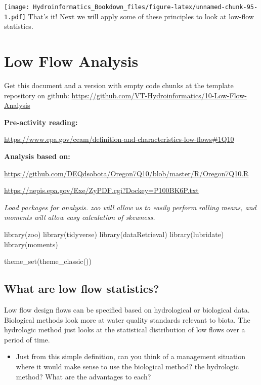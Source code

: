 \documentclass[
]{book}
\newenvironment{Shaded}{\begin{snugshade}}{\end{snugshade}}
\newcommand{\FunctionTok}[1]{\textcolor[rgb]{0.00,0.00,0.00}{#1}}
\newcommand{\NormalTok}[1]{#1}
\providecommand{\tightlist}{%
  \setlength{\itemsep}{0pt}\setlength{\parskip}{0pt}}
\begin{document}
\texttt{[image: Hydroinformatics\_Bookdown\_files/figure-latex/unnamed-chunk-95-1.pdf]}
That's it! Next we will apply some of these principles to look at low-flow statistics.

\hypertarget{lfas}{%
\chapter{Low Flow Analysis}\label{lfas}}

Get this document and a version with empty code chunks at the template repository on github: \url{https://github.com/VT-Hydroinformatics/10-Low-Flow-Analysis}

\textbf{Pre-activity reading:}

\url{https://www.epa.gov/ceam/definition-and-characteristics-low-flows\#1Q10}

\textbf{Analysis based on:}

\url{https://github.com/DEQdsobota/Oregon7Q10/blob/master/R/Oregon7Q10.R}

\url{https://nepis.epa.gov/Exe/ZyPDF.cgi?Dockey=P100BK6P.txt}

\emph{Load packages for analysis. zoo will allow us to easily perform rolling means, and moments will allow easy calculation of skewness.}

\begin{Shaded}
\begin{Highlighting}[]
\FunctionTok{library}\NormalTok{(zoo)}
\FunctionTok{library}\NormalTok{(tidyverse)}
\FunctionTok{library}\NormalTok{(dataRetrieval)}
\FunctionTok{library}\NormalTok{(lubridate)}
\FunctionTok{library}\NormalTok{(moments)}

\FunctionTok{theme\_set}\NormalTok{(}\FunctionTok{theme\_classic}\NormalTok{())}
\end{Highlighting}
\end{Shaded}

\hypertarget{what-are-low-flow-statistics}{%
\section{What are low flow statistics?}\label{what-are-low-flow-statistics}}

Low flow design flows can be specified based on hydrological or biological data. Biological methods look more at water quality standards relevant to biota. The hydrologic method just looks at the statistical distribution of low flows over a period of time.

\begin{itemize}
\tightlist
\item
  Just from this simple definition, can you think of a management situation where it would make sense to use the biological method? the hydrologic method? What are the advantages to each?
\end{itemize}
\end{document}

